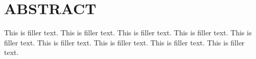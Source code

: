 


\chapter*{ABSTRACT}

This is filler text. This is filler text. This is filler text. This is filler text. This is filler text. This is filler text. This is filler text. This is filler text. This is filler text.


\vfill
